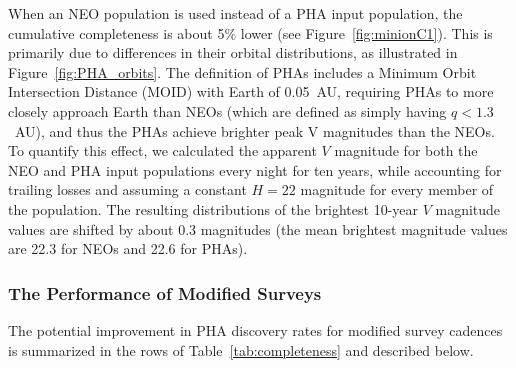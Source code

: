 When an NEO population is used instead of a PHA input population, the cumulative completeness is about 5\% lower
(see Figure~\ref{fig:minionC1}). This is primarily due to differences in their orbital distributions, as illustrated in Figure~\ref{fig:PHA_orbits}. The definition of PHAs includes a Minimum Orbit Intersection Distance (MOID) with Earth of 0.05~AU, requiring PHAs to more closely approach Earth than NEOs (which are defined as simply having $q<1.3$~AU), and thus the PHAs achieve brighter peak V magnitudes than the NEOs. To quantify this effect, we calculated the apparent $V$ magnitude for both the NEO and PHA input populations every night for ten years, while accounting for trailing losses and assuming a constant $H=22$ magnitude for every member of the population. The resulting distributions of the
brightest 10-year $V$ magnitude values are shifted by about 0.3 magnitudes (the mean brightest magnitude values are 22.3 for NEOs and 22.6 for PHAs).


\subsubsection{The Performance of Modified Surveys}

The potential improvement in PHA discovery rates for modified survey cadences is
summarized in the rows of Table~\ref{tab:completeness} and described below.

